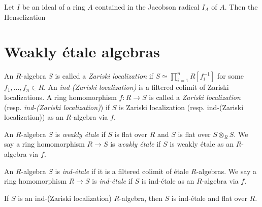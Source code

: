 \begin{lemma}
    Let \(I\) be an ideal of a ring \(A\) contained in the Jacobson radical \(I_A\) of \(A\). Then the Henselization 
\end{lemma}

\section{Weakly étale algebras}

\begin{definition}
    \label{def:ind-zariski-localization}

    An $R$-algebra $S$ is called a \textit{Zariski localization} if $S \simeq \prod_{i=1}^n R[f_i^{-1}]$ for some $f_1,\dots,f_n \in R$. An \textit{ind-(Zariski localization)} is a filtered colimit of Zariski localizations. A ring homomorphism $f : R \to S$ is called a \textit{Zariski localization} (resp. \emph{ind-(Zariski localization)}) if $S$ is Zariski localization (resp. ind-(Zariski localization)) as an $R$-algebra via $f$.
\end{definition}

\begin{definition}
    An $R$-algebra $S$ is \emph{weakly étale} if $S$ is flat over $R$ and
    $S$ is flat over $S \otimes_{R} S$. We say a ring homomorphism
    $R \to S$ is \emph{weakly étale} if $S$ is weakly étale as an $R$-algebra via $f$.
    \label{def:weakly-etale-algebra}
\end{definition}

\begin{definition}
    An $R$-algebra $S$ is \emph{ind-étale} if it is a filtered colimit of étale $R$-algebras.
    We say a ring homomorphism $R \to S$ is \emph{ind-étale} if $S$ is ind-étale as an $R$-algebra via $f$.
    \label{def:ind-etale-algebra}
\end{definition}

\begin{lemma}
    \label{lem:ind-etale-flat-of-ind-Zariski}

    If \(S\) is an ind-(Zariski localization) \(R\)-algebra, then \(S\) is ind-étale and flat over \(R\).
\end{lemma}

